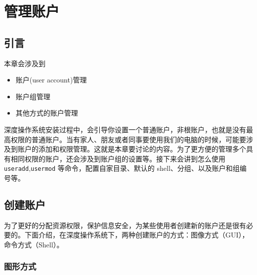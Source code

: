 \documentclass[doctor,openright,twoside]{sjtuthesis}
\providecommand{\tightlist}{%
    \setlength{\itemsep}{0pt}\setlength{\parskip}{0pt}}
\newcommand{\passthrough}[1]{#1}
\theoremstyle{plain}
\theoremstyle{definition}
\theoremstyle{remark}
\theoremstyle{ocrenumbox}
\theoremstyle{plain}
\begin{document}
\hypertarget{manager-user}{%
\chapter{管理账户}\label{manager-user}}

\hypertarget{-1}{%
\section{引言}\label{-1}}

本章会涉及到

\begin{itemize}
\tightlist
\item
  账户(user account)管理
\item
  账户组管理
\item
  其他方式的账户管理
\end{itemize}

深度操作系统安装过程中，会引导你设置一个普通账户，非根账户，也就是没有最高权限的普通账户。当有家人、朋友或者同事要使用我们的电脑的时候，可能要涉及到账户的添加和权限管理。这就是本章要讨论的内容。为了更方便的管理多个具有相同权限的账户，还会涉及到账户组的设置等。接下来会讲到怎么使用
\passthrough{\lstinline!useradd!},\passthrough{\lstinline!usermod!}
等命令，配置自家目录、默认的 shell、分组、以及账户和组编号等。

\section{创建账户}

为了更好的分配资源权限，保护信息安全，为某些使用者创建新的账户还是很有必要的。下面介绍，在深度操作系统下，两种创建账户的方式：图像方式（GUI），命令方式（Shell）。

\subsection{图形方式}
\end{document}
